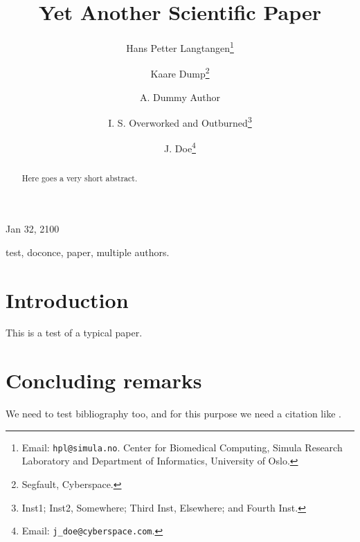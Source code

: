 \documentclass[leqno,final]{siamltex}
\begin{document}
\newcommand{\exercisesection}[1]{\subsection*{#1}}


\title{Yet Another Scientific Paper}
\author{Hans Petter Langtangen\thanks{Email: \texttt{hpl@simula.no}. Center for Biomedical Computing, Simula Research Laboratory and Department of Informatics, University of Oslo.}
\and Kaare Dump\thanks{Segfault, Cyberspace.}
\and A. Dummy Author
\and I. S. Overworked and Outburned\thanks{Inst1; Inst2, Somewhere; Third Inst, Elsewhere; and Fourth Inst.}
\and J. Doe\thanks{Email: \texttt{j\_doe@cyberspace.com}.}}
\begin{center}
Jan 32, 2100
\end{center}
\vspace{1cm}
\begin{abstract}
Here goes
a very short
abstract.
\end{abstract}
\begin{keywords}
test, doconce, paper, multiple authors.
\end{keywords}
\vspace{1cm} %
\section{Introduction}
This is a test of a typical paper.
\section{Concluding remarks}
We need to test bibliography too, and for this purpose we need
a citation like \cite{Langtangen_1992c,Langtangen_1994a}.


\end{document}
